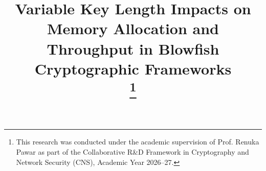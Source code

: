 \documentclass[conference]{IEEEtran}
\begin{document}
\title{Variable Key Length Impacts on Memory Allocation and Throughput in Blowfish Cryptographic Frameworks\\
\thanks{This research was conducted under the academic supervision of Prof. Renuka Pawar as part of the Collaborative R\&D Framework in Cryptography and Network Security (CNS), Academic Year 2026--27.}
}

\author{
\and
{}
}

\maketitle
\end{document}
